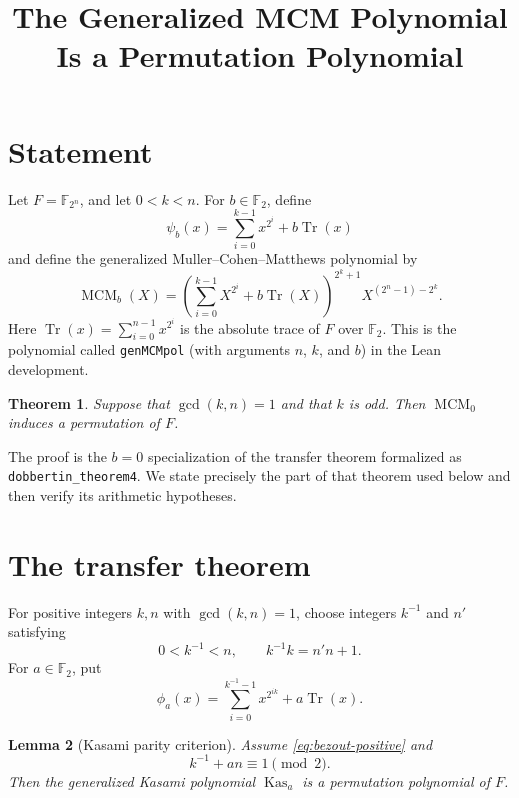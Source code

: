 \documentclass[11pt]{article}
\title{The Generalized MCM Polynomial Is a Permutation Polynomial}
\author{}
\date{}
\newtheorem{theorem}{Theorem}
\newtheorem{lemma}[theorem]{Lemma}
\newcommand{\F}{\mathbb{F}}
\newcommand{\Tr}{\operatorname{Tr}}
\newcommand{\MCM}{\operatorname{MCM}}
\newcommand{\Kas}{\operatorname{Kas}}
\begin{document}
\maketitle

\section{Statement}

Let $F=\F_{2^n}$, and let $0<k<n$.  For $b\in\F_2$, define
\[
  \psi_b(x)=\sum_{i=0}^{k-1}x^{2^i}+b\Tr(x)
\]
and define the generalized Muller--Cohen--Matthews polynomial by
\[
  \MCM_b(X)=
  \left(\sum_{i=0}^{k-1}X^{2^i}+b\Tr(X)\right)^{2^k+1}
  X^{(2^n-1)-2^k}.
\]
Here $\Tr(x)=\sum_{i=0}^{n-1}x^{2^i}$ is the absolute trace of $F$ over
$\F_2$.  This is the polynomial called \texttt{genMCMpol} (with arguments
$n$, $k$, and $b$) in the Lean development.

\begin{theorem}
\label{thm:mcm-permutation}
Suppose that $\gcd(k,n)=1$ and that $k$ is odd.  Then $\MCM_0$ induces a
permutation of $F$.
\end{theorem}

The proof is the $b=0$ specialization of the transfer theorem formalized as
\verb|dobbertin_theorem4|.  We state precisely the part of that theorem used
below and then verify its arithmetic hypotheses.

\section{The transfer theorem}

For positive integers $k,n$ with $\gcd(k,n)=1$, choose integers
$k^{-1}$ and $n'$ satisfying
\begin{equation}
\label{eq:bezout-positive}
  0<k^{-1}<n,
  \qquad
  k^{-1}k=n'n+1.
\end{equation}
For $a\in\F_2$, put
\[
  \phi_a(x)=\sum_{i=0}^{k^{-1}-1}x^{2^{ik}}+a\Tr(x).
\]

\begin{lemma}[Kasami parity criterion]
\label{lem:kasami-parity}
Assume \eqref{eq:bezout-positive} and
\begin{equation}
\label{eq:kasami-parity}
  k^{-1}+an\equiv1\pmod2.
\end{equation}
Then the generalized Kasami polynomial $\Kas_a$ is a permutation polynomial
of $F$.
\end{lemma}
\end{document}
